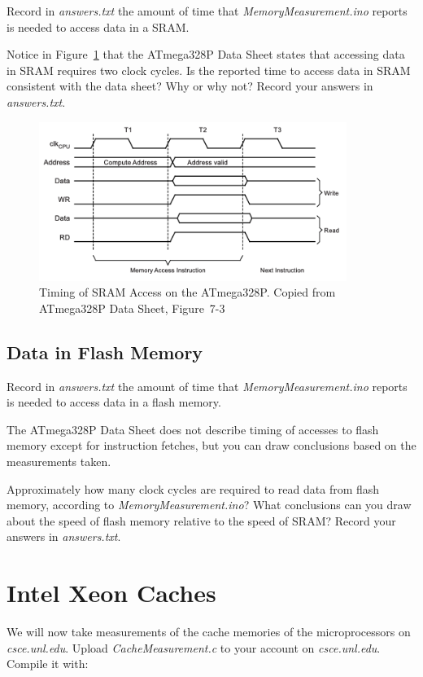 Record in \textit{answers.txt} the amount of time that
\textit{MemoryMeasurement.ino} reports is needed to access data in a SRAM.

Notice in Figure~\ref{fig:SramTiming} that the ATmega328P Data Sheet states
that accessing data in SRAM requires two clock cycles. Is the reported time to
access data in SRAM consistent with the data sheet? Why or why not? Record your
answers in \textit{answers.txt}.

\begin{figure}
    \centering
    \includegraphics[width=10cm]{ATmega328P_SramTiming}
    \caption{Timing of SRAM Access on the ATmega328P. \tiny Copied from ATmega328P Data Sheet, Figure~7-3 \label{fig:SramTiming}}
\end{figure}

\subsection{Data in Flash Memory}

Record in \textit{answers.txt} the amount of time that
\textit{MemoryMeasurement.ino} reports is needed to access data in a flash
memory.

The ATmega328P Data Sheet does not describe timing of accesses to flash memory
except for instruction fetches, but you can draw conclusions based on the
measurements taken.

Approximately how many clock cycles are required to read data from flash
memory, according to \textit{MemoryMeasurement.ino}? What conclusions can you
draw about the speed of flash memory relative to the speed of SRAM? Record your
answers in \textit{answers.txt}.

\section{Intel Xeon Caches}

We will now take measurements of the cache memories of the microprocessors on
\textit{csce.unl.edu}. Upload \textit{CacheMeasurement.c} to your account on
\textit{csce.unl.edu}. Compile it with:

